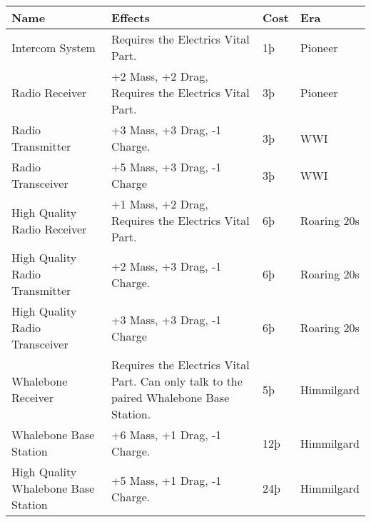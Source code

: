 \documentclass{article}
\begin{document}
\begin{tabular}{|l|l|l|l|}
    \hline
    Name                                & Effects                                              & Cost        & Era     \\\hline
    Intercom System                     & Requires the Electrics Vital Part.                   & 1þ          & Pioneer \\\hline
    Radio Receiver                      & +2 Mass, +2 Drag, Requires the Electrics Vital Part. &
    3þ                                  & Pioneer                                                                      \\\hline
    Radio Transmitter                   & +3 Mass, +3 Drag, -1 Charge.                         & 3þ          & WWI     \\\hline
    Radio Transceiver                   & +5 Mass, +3 Drag, -1 Charge                          & 3þ          & WWI     \\\hline
    High Quality Radio Receiver         & +1 Mass, +2 Drag, Requires the Electrics
    Vital Part.                         & 6þ                                                   & Roaring 20s           \\\hline
    High Quality Radio Transmitter      & +2 Mass, +3 Drag, -1 Charge.                         & 6þ          &
    Roaring 20s                                                                                                        \\\hline
    High Quality Radio Transceiver      & +3 Mass, +3 Drag, -1 Charge                          & 6þ          &
    Roaring 20s                                                                                                        \\\hline
    Whalebone Receiver                  & Requires the Electrics Vital Part. Can only talk to
    the paired Whalebone Base Station.  & 5þ                                                   & Himmilgard            \\\hline
    Whalebone Base Station              & +6 Mass, +1 Drag, -1 Charge.                         & 12þ         &
    Himmilgard                                                                                                         \\\hline
    High Quality Whalebone Base Station & +5 Mass, +1 Drag, -1 Charge.                         & 24þ
                                        & Himmilgard                                                                   \\\hline
\end{tabular}
\end{document}

